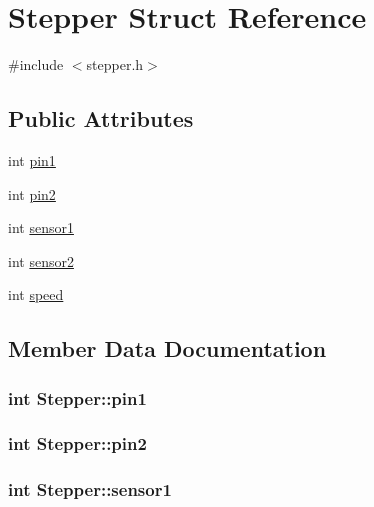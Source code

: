 \hypertarget{structStepper}{}\section{Stepper Struct Reference}
\label{structStepper}


{\ttfamily \#include $<$stepper.\+h$>$}

\subsection*{Public Attributes}
\begin{DoxyCompactItemize}
\item 
int \hyperlink{structStepper_a29a6835076f47ffc7062ffb099de4230}{pin1}
\item 
int \hyperlink{structStepper_ac069d1ec61e8fbfdd26ad798f2c75d1f}{pin2}
\item 
int \hyperlink{structStepper_a26c979cd9ba26844ac8080db4cc7e908}{sensor1}
\item 
int \hyperlink{structStepper_aefcdad417a6a9a606ef5dfc86f0d5bbf}{sensor2}
\item 
int \hyperlink{structStepper_a79adf80b4bfffb08803fc2e0e8da4558}{speed}
\end{DoxyCompactItemize}


\subsection{Member Data Documentation}
\subsubsection[{\texorpdfstring{pin1}{pin1}}]{\setlength{\rightskip}{0pt plus 5cm}int Stepper\+::pin1}\hypertarget{structStepper_a29a6835076f47ffc7062ffb099de4230}{}\label{structStepper_a29a6835076f47ffc7062ffb099de4230}
\subsubsection[{\texorpdfstring{pin2}{pin2}}]{\setlength{\rightskip}{0pt plus 5cm}int Stepper\+::pin2}\hypertarget{structStepper_ac069d1ec61e8fbfdd26ad798f2c75d1f}{}\label{structStepper_ac069d1ec61e8fbfdd26ad798f2c75d1f}
\subsubsection[{\texorpdfstring{sensor1}{sensor1}}]{\setlength{\rightskip}{0pt plus 5cm}int Stepper\+::sensor1}\hypertarget{structStepper_a26c979cd9ba26844ac8080db4cc7e908}{}\label{structStepper_a26c979cd9ba26844ac8080db4cc7e908}
